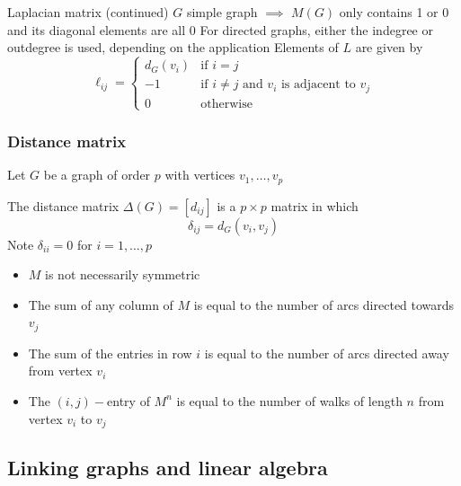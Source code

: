\documentclass[aspectratio=169]{beamer}\usepackage[]{graphicx}\usepackage[]{xcolor}
\begin{document}
\begin{frame}{Laplacian matrix (continued)}
$G$ simple graph $\implies$ $M(G)$ only contains 1 or 0 and its diagonal elements are all 0
\vfill
For directed graphs, either the indegree or outdegree is used, depending on the application
\vfill
Elements of $L$ are given by
\[
\ell_{ij}=\begin{cases}
	d_G(v_{i}) & \text{if } i=j\\
	-1 & \text{if } i\neq j \text{ and } v_{i} 
	\text{ is adjacent to }v_{j}\\
	0 & \text{otherwise}
\end{cases}
\]
\end{frame}


\begin{frame}\frametitle{Distance matrix}
	Let $G$ be a graph of order $p$ with vertices $v_1, \ldots , v_p$
	\begin{definition}
	The distance matrix $\Delta(G)=[d_{ij}]$ is a $p\times p$ matrix in which
	$$\delta_{ij}=
	d_G(v_i,v_j)
	$$
	Note $\delta_{ii}=0$ for $i=1,\ldots, p$
	\end{definition}
\end{frame}

\begin{frame}
	\begin{property}
		\begin{itemize}
		\item $M$ is not necessarily symmetric
		\item The sum of any column of $M$ is equal to the number of arcs directed towards $v_j$
		\item The sum of the entries in row $i$ is equal to the number of arcs directed away from vertex $v_i$
		\item The $(i,j)-$entry of $M^n$ is equal to the number of walks of length $n$ from vertex $v_i$ to $v_j$
		\end{itemize}
	\end{property}
\end{frame}



\subsection{Linking graphs and linear algebra}
\end{document}
